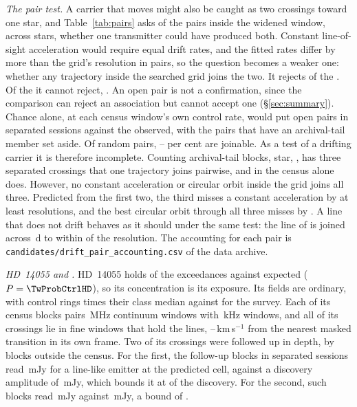 \emph{The pair test.} A carrier that moves might also be caught as two
crossings toward one star, and Table~\ref{tab:pairs} asks of the \TjNPair{}
pairs inside the widened window, across \TjNStarPair{} stars, whether one
transmitter could have produced both. Constant line-of-sight acceleration
would require equal drift rates, and the fitted rates differ by more than the
grid's resolution in \TjUneqDriftOf{} pairs, so the question
becomes a weaker one: whether any trajectory inside the searched grid joins
the two. It rejects \TjNExcl{} of the \TjNPair. Of the \TjNOpen{} it
cannot reject, \TjOpenEdgeClause. An open pair is not a confirmation, since the
comparison can reject an association but cannot accept one
(\S\ref{sec:summary}). Chance alone, at each census window's own control
rate, would put \OpExpSepRange{} open pairs in separated sessions against the
\OpObsSep{} observed, with the pairs that have an archival-tail member set
aside. Of random pairs, \OpJoinPctLo--\OpJoinPctHi{} per cent are
joinable. As a test of a drifting carrier it is therefore incomplete.
Counting archival-tail blocks, \OpNTriAllWord{} star, \OpTriStars, has three
separated crossings that one trajectory joins pairwise, and in the census
alone \OpNTriCenWord{} does. However, no constant acceleration or circular
orbit inside the grid joins all three. Predicted from the first two, the
third misses a constant acceleration by at least
\TrAMissMin{} resolutions, and the best circular orbit through all three
misses by \TrJointMissMin. A line that does not drift behaves as it should
under the same test: the \TjCtlLine{} line of \TjCtlStar{} is joined across
\TjCtlDtD\,d to within \TjCtlNSig{} of the resolution. The accounting for
each pair is
\texttt{candidates/\allowbreak drift\_pair\_accounting.csv} of the data
archive.

\label{sec:twostars}%
\emph{HD~14055 and \BkAlmaName.} HD~14055 holds \TwNExcHD{} of the
exceedances against \TwExpCtrlHD{} expected ($P=\TwProbCtrlHD$), so its
concentration is its exposure. Its fields are ordinary, with control rings
\TwRingQHD{} times their class median against \TwRingQSurv{} for the survey.
Each of its \LrHdNBlk{} census blocks pairs \LrHdNCoarse{}
\LrHdCoarseChanMHz\,MHz continuum windows with \LrHdNFine{}
\LrHdFineChanKHz\,kHz windows, and all \LrHdNCross{} of its crossings lie in
fine windows that hold the \LrHdFineLines{} lines, \TwHDMaskLo--\TwHDMaskHi\,km\,s$^{-1}$ from the nearest masked
transition in its own frame. Two of its crossings were followed up in depth, by blocks outside the
census. For the first, the \TwHDNDeepSepFirst{} follow-up blocks in separated
sessions read \TwHDRepFirst\,mJy for a line-like emitter at the predicted
cell, against a discovery amplitude of \TwHDDiscFirst\,mJy, which bounds it
at \TwHDFracFirst{} of the discovery. For the second, \TwHDNDeepSepSecond{}
such blocks read \TwHDRepSecond\,mJy against \TwHDDiscSecond\,mJy, a bound
of \TwHDFracSecond.

